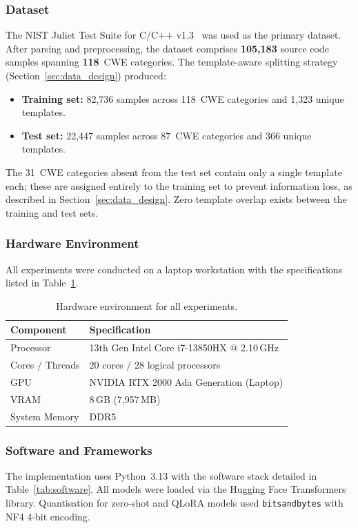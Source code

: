 \documentclass[conference]{IEEEtran}
\begin{document}
\subsubsection{Dataset}
The NIST Juliet Test Suite for C/C++ v1.3~\cite{juliet2017} was used as the
primary dataset.  After parsing and preprocessing, the dataset comprises
\textbf{105,183} source code samples spanning \textbf{118}~CWE categories.
The template-aware splitting strategy (Section~\ref{sec:data_design})
produced:
\begin{itemize}
    \item \textbf{Training set:} 82,736 samples across 118~CWE categories
          and 1,323 unique templates.
    \item \textbf{Test set:} 22,447 samples across 87~CWE categories
          and 366 unique templates.
\end{itemize}
The 31~CWE categories absent from the test set contain only a single
template each; these are assigned entirely to the training set to prevent
information loss, as described in Section~\ref{sec:data_design}.
Zero template overlap exists between the training and test sets.

\subsubsection{Hardware Environment}
All experiments were conducted on a laptop workstation with the
specifications listed in Table~\ref{tab:hardware}.

\begin{table}[t]
\centering
\caption{Hardware environment for all experiments.}
\label{tab:hardware}
\begin{tabular}{ll}
\hline
\textbf{Component}    & \textbf{Specification} \\
\hline
Processor             & 13th Gen Intel Core i7-13850HX @ 2.10\,GHz \\
Cores / Threads       & 20 cores / 28 logical processors \\
GPU                   & NVIDIA RTX 2000 Ada Generation (Laptop) \\
VRAM                  & 8\,GB (7,957\,MB) \\
System Memory         & DDR5 \\
\hline
\end{tabular}
\end{table}

\subsubsection{Software and Frameworks}
The implementation uses Python~3.13 with the software stack detailed in
Table~\ref{tab:software}.  All models were loaded via the Hugging Face
Transformers library.  Quantisation for zero-shot and QLoRA models used
\texttt{bitsandbytes} with NF4 4-bit encoding.
\end{document}
